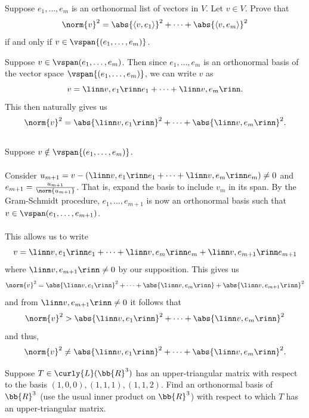 \documentclass[12pt, letterpaper]{hmcpset}
\begin{document}
\pagebreak

\begin{problem}[2]
	Suppose $e_1, \ldots, e_m$ is an orthonormal list of vectors in $V$. Let $v \in V$. Prove that
	\[
		\norm{v}^2 = \abs{\langle v, e_1 \rangle}^2 + \cdots + \abs{\langle v, e_m \rangle}^2
	\]
	if and only if $v \in \vspan{(e_1, \ldots, e_m)}$.
\end{problem}

\begin{solution}
	Suppose $v \in \vspan(e_1, \ldots, e_m)$. Then since $e_1, \ldots, e_m$ is an orthonormal basis of the vector space $\vspan{(e_1, \ldots, e_m)}$, we can write $v$ as
	\[
		v = \linn v, e_1 \rinn e_1 + \cdots + \linn v, e_m \rinn.
	\]
	This then naturally gives us
	\[
		\norm{v}^2 = \abs{\linn v, e_1 \rinn}^2 + \cdots + \abs{\linn v, e_m \rinn}^2.
	\]\\
	Suppose $v \notin \vspan{(e_1, \ldots, e_m)}$.\\\\
	Consider $u_{m + 1} = v - (\linn v, e_1 \rinn e_1 + \cdots + \linn v, e_m \rinn e_m) \neq 0$ and $e_{m + 1} = \frac{u_{m + 1}}{\norm{u_{m + 1}}}$. That is, expand the basis to include $v_m$ in its span. By the Gram-Schmidt procedure, $e_1, \ldots, e_{m + 1}$ is now an orthonormal basis such that $v \in \vspan (e_1, \ldots, e_{m + 1})$.\\\\
	This allows us to write 
	\[
		v = \linn v, e_1 \rinn e_1 + \cdots + \linn v, e_m \rinn e_m + \linn v, e_{m + 1} \rinn e_{m + 1}
	\]
	where $\linn v, e_{m + 1} \rinn \neq 0$ by our supposition. This gives us 
	\[
		\norm{v}^2 = \abs{\linn v, e_1 \rinn}^2 + \cdots + \abs{\linn v, e_m \rinn} + \abs{\linn v, e_{m + 1} \rinn}^2
	\]
	and from $\linn v, e_{m + 1} \rinn \neq 0$ it follows that
	\[
		\norm{v}^2 > \abs{\linn v, e_1 \rinn}^2 + \cdots + \abs{\linn v, e_m \rinn}^2
	\]
	and thus,
	\[
		\norm{v}^2 \neq \abs{\linn v, e_1 \rinn}^2 + \cdots + \abs{\linn v, e_m \rinn}^2.
	\]
\end{solution}

\pagebreak

\begin{problem}[3]
	Suppose $T \in \curly{L}(\bb{R}^3)$ has an upper-triangular matrix with respect to the basis $(1, 0, 0), (1, 1, 1), (1, 1, 2)$. Find an orthonormal basis of $\bb{R}^3$ (use the usual inner product on $\bb{R}^3$) with respect to which $T$ has an upper-triangular matrix.
\end{problem}
\end{document}
